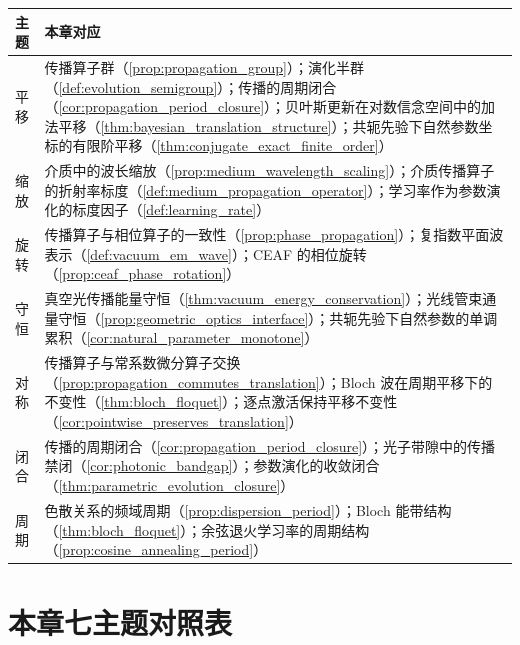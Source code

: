 \begin{remark}[本章与全书七主题对照]\label{rem:propagation_seven_themes}
\begin{center}
\small
\renewcommand{\arraystretch}{1.3}
\setlength{\tabcolsep}{4pt}
\begin{tabular}{@{}p{2.0cm} p{10.5cm}@{}}
\toprule
主题 & 本章对应 \\
\midrule
平移 & 传播算子群（\cref{prop:propagation_group}）；演化半群（\cref{def:evolution_semigroup}）；传播的周期闭合（\cref{cor:propagation_period_closure}）；贝叶斯更新在对数信念空间中的加法平移（\cref{thm:bayesian_translation_structure}）；共轭先验下自然参数坐标的有限阶平移（\cref{thm:conjugate_exact_finite_order}） \\
缩放 & 介质中的波长缩放（\cref{prop:medium_wavelength_scaling}）；介质传播算子的折射率标度（\cref{def:medium_propagation_operator}）；学习率作为参数演化的标度因子（\cref{def:learning_rate}） \\
旋转 & 传播算子与相位算子的一致性（\cref{prop:phase_propagation}）；复指数平面波表示（\cref{def:vacuum_em_wave}）；CEAF 的相位旋转（\cref{prop:ceaf_phase_rotation}） \\
守恒 & 真空光传播能量守恒（\cref{thm:vacuum_energy_conservation}）；光线管束通量守恒（\cref{prop:geometric_optics_interface}）；共轭先验下自然参数的单调累积（\cref{cor:natural_parameter_monotone}） \\
对称 & 传播算子与常系数微分算子交换（\cref{prop:propagation_commutes_translation}）；Bloch 波在周期平移下的不变性（\cref{thm:bloch_floquet}）；逐点激活保持平移不变性（\cref{cor:pointwise_preserves_translation}） \\
闭合 & 传播的周期闭合（\cref{cor:propagation_period_closure}）；光子带隙中的传播禁闭（\cref{cor:photonic_bandgap}）；参数演化的收敛闭合（\cref{thm:parametric_evolution_closure}） \\
周期 & 色散关系的频域周期（\cref{prop:dispersion_period}）；Bloch 能带结构（\cref{thm:bloch_floquet}）；余弦退火学习率的周期结构（\cref{prop:cosine_annealing_period}） \\
\bottomrule
\end{tabular}
\end{center}
\end{remark}

\section*{本章七主题对照表}

